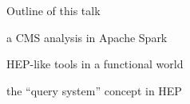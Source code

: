 \documentclass{beamer}
\begin{document}
\begin{frame}{}


\end{frame}

\begin{frame}{Outline of this talk}
\Large
\begin{description}\setlength{\itemsep}{0.5 cm}
\item[Data plumbing:] a CMS analysis in Apache Spark
\item[Histogrammar:] HEP-like tools in a functional world
\item[Femtocode:] the ``query system'' concept in HEP
\end{description}
\end{frame}
\end{document}
